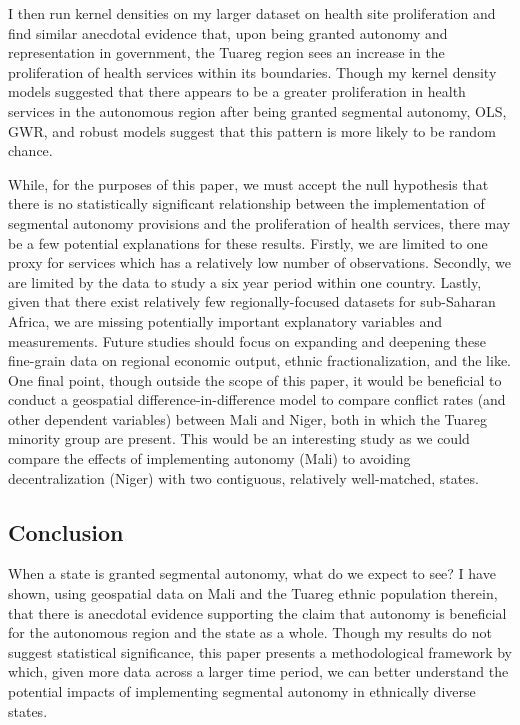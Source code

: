 \documentclass[12pt]{article}
\begin{document}
I then run kernel densities on my larger dataset on health site proliferation and find similar anecdotal evidence that, upon being granted autonomy and representation in government, the Tuareg region sees an increase in the proliferation of health services within its boundaries. Though my kernel density models suggested that there appears to be a greater proliferation in health services in the autonomous region after being granted segmental autonomy, OLS, GWR, and robust models suggest that this pattern is more likely to be random chance. 

While, for the purposes of this paper, we must accept the null hypothesis that there is no statistically significant relationship between the implementation of segmental autonomy provisions and the proliferation of health services, there may be a few potential explanations for these results. Firstly, we are limited to one proxy for services which has a relatively low number of observations. Secondly, we are limited by the data to study a six year period within one country. Lastly, given that there exist relatively few regionally-focused datasets for sub-Saharan Africa, we are missing potentially important explanatory variables and measurements. Future studies should focus on expanding and deepening these fine-grain data on regional economic output, ethnic fractionalization, and the like. One final point, though outside the scope of this paper, it would be beneficial to conduct a geospatial difference-in-difference model to compare conflict rates (and other dependent variables) between Mali and Niger, both in which the Tuareg minority group are present. This would be an interesting study as we could compare the effects of implementing autonomy (Mali) to avoiding decentralization (Niger) with two contiguous, relatively well-matched, states. 

\subsection{Conclusion}
When a state is granted segmental autonomy, what do we expect to see? I have shown, using geospatial data on Mali and the Tuareg ethnic population therein, that there is anecdotal evidence supporting the claim that autonomy is beneficial for the autonomous region and the state as a whole. Though my results do not suggest statistical significance, this paper presents a methodological framework by which, given more data across a larger time period, we can better understand the potential impacts of implementing segmental autonomy in ethnically diverse states.
\end{document}
